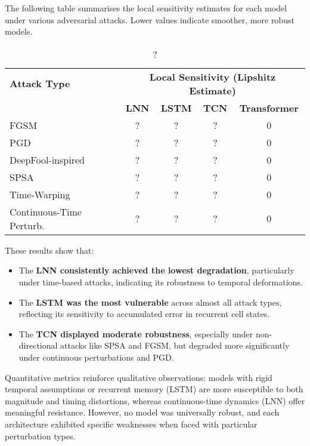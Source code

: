 The following table summarises the local sensitivity estimates for each model under various adversarial attacks. Lower values indicate smoother, more robust models.

\begin{table}[H]
    \centering
    \small
    \begin{tabular}{|l|cccc|}
    \hline
    \textbf{Attack Type} & \multicolumn{4}{c|}{\textbf{Local Sensitivity (Lipshitz Estimate)}} \\
    \cline{2-5}
     & \textbf{LNN} & \textbf{LSTM} & \textbf{TCN} & \textbf{Transformer} \\
    \hline
    FGSM                     & ? & ? & ? & 0 \\
    PGD                      & ? & ? & ? & 0 \\
    DeepFool-inspired        & ? & ? & ? & 0 \\
    SPSA                     & ? & ? & ? & 0 \\
    Time-Warping             & ? & ? & ? & 0 \\
    Continuous-Time Perturb. & ? & ? & ? & 0 \\
    \hline
    \end{tabular}
    \caption{?}
    \label{tab:attack_results_sensitivity}
\end{table}


These results show that:
\begin{itemize}
    \item The \textbf{LNN consistently achieved the lowest degradation}, particularly under time-based attacks, indicating its robustness to temporal deformations.
    \item The \textbf{LSTM was the most vulnerable} across almost all attack types, reflecting its sensitivity to accumulated error in recurrent cell states.
    \item The \textbf{TCN displayed moderate robustness}, especially under non-directional attacks like SPSA and FGSM, but degraded more significantly under continuous perturbations and PGD.
\end{itemize}


Quantitative metrics reinforce qualitative observations: models with rigid temporal assumptions or recurrent memory (LSTM) are more susceptible to both magnitude and timing distortions, whereas continuous-time dynamics (LNN) offer meaningful resistance. However, no model was universally robust, and each architecture exhibited specific weaknesses when faced with particular perturbation types.


